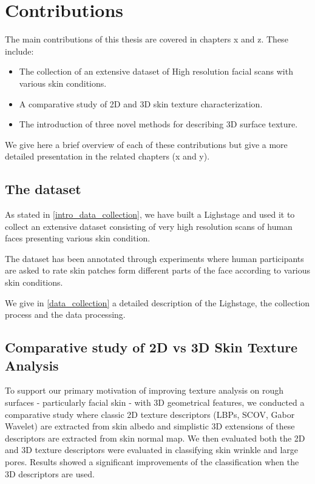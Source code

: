 
\section{Contributions}
The main contributions of this thesis are covered in chapters x and z. These include:

\begin{itemize}
\item The collection of an extensive dataset of High resolution facial scans with various skin conditions.

\item A comparative study of 2D and 3D skin texture characterization.

\item The introduction of three novel methods for describing 3D surface texture. 

\end{itemize}

We give here a brief overview of each of these contributions but give a more detailed presentation  in the related chapters (x and y).

\subsection{The dataset}
As stated in \ref{intro_data_collection}, we have built a Lighstage and used it to collect an extensive dataset consisting of very high resolution scans of human faces presenting various skin condition.

The dataset has been annotated through experiments where human participants are asked to rate skin patches form different parts of the face according to various skin conditions. 

We give in \ref{data_collection} a detailed description of the Lighstage, the collection process and the data processing.

\subsection{Comparative study of 2D vs 3D Skin Texture Analysis}
To support our primary motivation of improving texture analysis on rough surfaces - particularly facial skin - with 3D geometrical features, we conducted a comparative study \cite{Seck:2014} where classic 2D texture descriptors (LBPs, SCOV, Gabor Wavelet) are extracted from skin albedo and simplistic 3D extensions of these descriptors are extracted from skin normal map. We then evaluated both the 2D and 3D texture descriptors were evaluated in classifying skin wrinkle and large pores. Results showed a significant improvements of the classification when the 3D descriptors are used.

